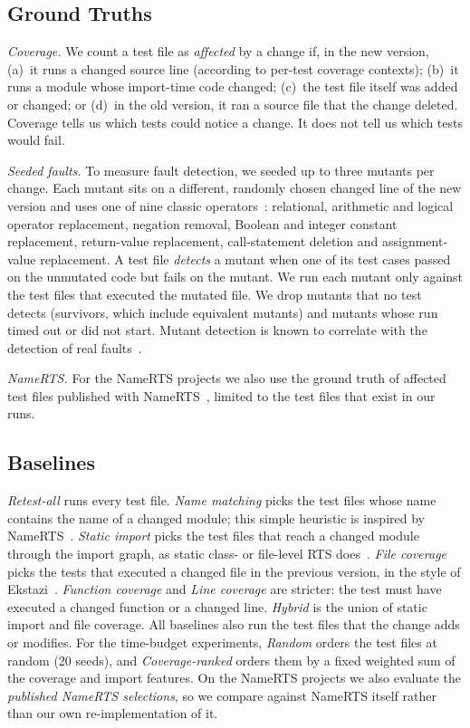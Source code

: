 \documentclass[conference]{IEEEtran}
\begin{document}
\subsection{Ground Truths}\label{sec:gt}
\emph{Coverage.} We count a test file as \textit{affected} by a change if, in the new version, (a)~it runs a changed source line (according to per-test coverage contexts); (b)~it runs a module whose import-time code changed; (c)~the test file itself was added or changed; or (d)~in the old version, it ran a source file that the change deleted. Coverage tells us which tests could notice a change. It does not tell us which tests would fail.

\emph{Seeded faults.} To measure fault detection, we seeded up to three mutants per change. Each mutant sits on a different, randomly chosen changed line of the new version and uses one of nine classic operators~\cite{jia2011mutation}: relational, arithmetic and logical operator replacement, negation removal, Boolean and integer constant replacement, return-value replacement, call-statement deletion and assignment-value replacement. A test file \emph{detects} a mutant when one of its test cases passed on the unmutated code but fails on the mutant. We run each mutant only against the test files that executed the mutated file. We drop mutants that no test detects (survivors, which include equivalent mutants) and mutants whose run timed out or did not start. Mutant detection is known to correlate with the detection of real faults~\cite{just2014mutants}.

\emph{NameRTS.} For the NameRTS projects we also use the ground truth of affected test files published with NameRTS~\cite{wang2026namerts}, limited to the test files that exist in our runs.

\subsection{Baselines}
\textit{Retest-all} runs every test file. \textit{Name matching} picks the test files whose name contains the name of a changed module; this simple heuristic is inspired by NameRTS~\cite{wang2026namerts}. \textit{Static import} picks the test files that reach a changed module through the import graph, as static class- or file-level RTS does~\cite{legunsen2016static}. \textit{File coverage} picks the tests that executed a changed file in the previous version, in the style of Ekstazi~\cite{gligoric2015ekstazi}. \textit{Function coverage} and \textit{Line coverage} are stricter: the test must have executed a changed function or a changed line. \textit{Hybrid} is the union of static import and file coverage. All baselines also run the test files that the change adds or modifies. For the time-budget experiments, \textit{Random} orders the test files at random (20 seeds), and \textit{Coverage-ranked} orders them by a fixed weighted sum of the coverage and import features. On the NameRTS projects we also evaluate the \textit{published NameRTS selections}, so we compare against NameRTS itself rather than our own re-implementation of it.
\end{document}

